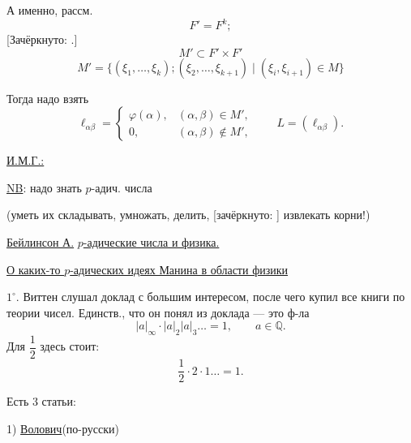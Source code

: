 А именно, рассм.
\begin{equation*}
 F'=F^k;
\end{equation*}
[Зачёркнуто: .]
\begin{equation*}
 M'\subset F'\times F'
\end{equation*}
\begin{equation}
 M'=\{(\xi_1,\ldots,\xi_k);(\xi_2,\ldots,\xi_{k+1})
 \mid(\xi_i,\xi_{i+1})\in M\}
 \tag{10}
\end{equation}

Тогда надо взять
\begin{equation*}
 \ell_{\alpha\beta}=
 \begin{cases}
 \varphi(\alpha),&(\alpha,\beta)\in M',\\
 0,&(\alpha,\beta)\notin M',
 \end{cases}
 \qquad L=(\ell_{\alpha\beta}).
\end{equation*}


\underline{И.М.Г.:}

\underline{NB}: надо знать $p$-адич. числа

(уметь их складывать, умножать, делить,
[зачёркнуто: ]
извлекать корни!)

\medskip
\underline{Бейлинсон А.}\qquad
\underline{$p$-адические числа и физика.}

\underline{О каких-то $p$-адических идеях Манина в области физики}

$1^{\circ}$. Виттен слушал доклад
с большим интересом, после чего купил все книги по теории чисел.
Единств., что он понял из доклада — это ф-ла
\begin{equation}
 |a|_\infty\cdot|a|_2|a|_3\ldots=1,\qquad a\in\mathbb Q.
 \tag{1}
\end{equation}
Для $\dfrac12$ здесь стоит:
\begin{equation*}
 \frac12\cdot2\cdot1\ldots=1.
\end{equation*}

Есть 3 статьи:

1) \underline{Волович}\qquad (по-русски)

